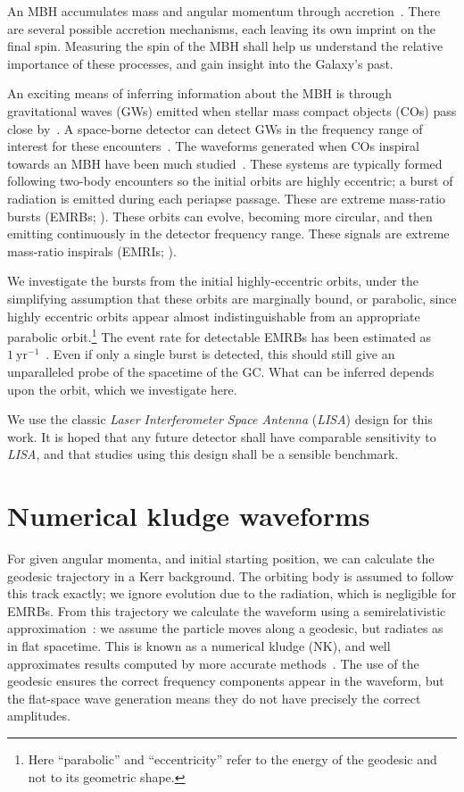 \documentclass[11pt,twoside]{article}
\begin{document}
An MBH accumulates mass and angular momentum through accretion~\citep{Volonteri2010}. There are several possible accretion mechanisms, each leaving its own imprint on the final spin. Measuring the spin of the MBH shall help us understand the relative importance of these processes, and gain insight into the Galaxy's past.

An exciting means of inferring information about the MBH is through gravitational waves (GWs) emitted when stellar mass compact objects (COs) pass close by~\citep{Sathyaprakash2009}. A space-borne detector can detect GWs in the frequency range of interest for these encounters~\citep{Danzmann2003, Amaro-Seoane2012a}. The waveforms generated when COs inspiral towards an MBH have been much studied~\citep{Glampedakis2005}. These systems are typically formed following two-body encounters so the initial orbits are highly eccentric; a burst of radiation is emitted during each periapse passage. These are extreme mass-ratio bursts (EMRBs; \citealt*{Rubbo2006}). These orbits can evolve, becoming more circular, and then emitting continuously in the detector frequency range. These signals are extreme mass-ratio inspirals (EMRIs; \citealt{Amaro-Seoane2007}).

We investigate the bursts from the initial highly-eccentric orbits, under the simplifying assumption that these orbits are marginally bound, or parabolic, since highly eccentric orbits appear almost indistinguishable from an appropriate parabolic orbit.\footnote{Here ``parabolic'' and ``eccentricity'' refer to the energy of the geodesic and not to its geometric shape.} The event rate for detectable EMRBs has been estimated as $1~\mathrm{yr^{-1}}$~\citep*{Hopman2007}. Even if only a single burst is detected, this should still give an unparalleled probe of the spacetime of the GC. What can be inferred depends upon the orbit, which we investigate here. 

We use the classic \textit{Laser Interferometer Space Antenna} (\textit{LISA}) design for this work. It is hoped that any future detector shall have comparable sensitivity to \textit{LISA}, and that studies using this design shall be a sensible benchmark.

\section{Numerical kludge waveforms}

For given angular momenta, and initial starting position, we can calculate the geodesic trajectory in a Kerr background. The orbiting body is assumed to follow this track exactly; we ignore evolution due to the radiation, which is negligible for EMRBs. From this trajectory we calculate the waveform using a semirelativistic approximation~\citep{Ruffini1981}: we assume the particle moves along a geodesic, but radiates as in flat spacetime. This is known as a numerical kludge (NK), and well approximates results computed by more accurate methods~\citep{Babak2007}. The use of the geodesic ensures the correct frequency components appear in the waveform, but the flat-space wave generation means they do not have precisely the correct amplitudes.
\end{document}
